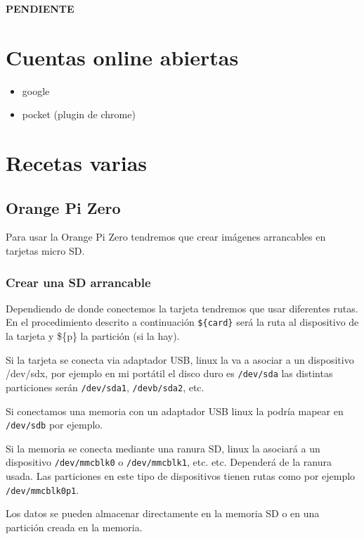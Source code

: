 \documentclass[12pt,spanish,]{article}
\providecommand{\tightlist}{%
  \setlength{\itemsep}{0pt}\setlength{\parskip}{0pt}}
\begin{document}
\textbf{PENDIENTE}

\section{Cuentas online abiertas}\label{cuentas-online-abiertas}

\begin{itemize}
\tightlist
\item
  google
\item
  pocket (plugin de chrome)
\end{itemize}

\section{Recetas varias}\label{recetas-varias}

\subsection{Orange Pi Zero}\label{orange-pi-zero}

Para usar la Orange Pi Zero tendremos que crear imágenes arrancables en
tarjetas micro SD.

\subsubsection{Crear una SD arrancable}\label{crear-una-sd-arrancable}

Dependiendo de donde conectemos la tarjeta tendremos que usar diferentes
rutas. En el procedimiento descrito a continuación \texttt{\$\{card\}}
será la ruta al dispositivo de la tarjeta y \$\{p\} la partición (si la
hay).

Si la tarjeta se conecta via adaptador USB, linux la va a asociar a un
dispositivo /dev/sdx, por ejemplo en mi portátil el disco duro es
\texttt{/dev/sda} las distintas particiones serán \texttt{/dev/sda1},
\texttt{/devb/sda2}, etc.

Si conectamos una memoria con un adaptador USB linux la podría mapear en
\texttt{/dev/sdb} por ejemplo.

Si la memoria se conecta mediante una ranura SD, linux la asociará a un
dispositivo \texttt{/dev/mmcblk0} o \texttt{/dev/mmcblk1}, etc. etc.
Dependerá de la ranura usada. Las particiones en este tipo de
dispositivos tienen rutas como por ejemplo \texttt{/dev/mmcblk0p1}.

Los datos se pueden almacenar directamente en la memoria SD o en una
partición creada en la memoria.
\end{document}
